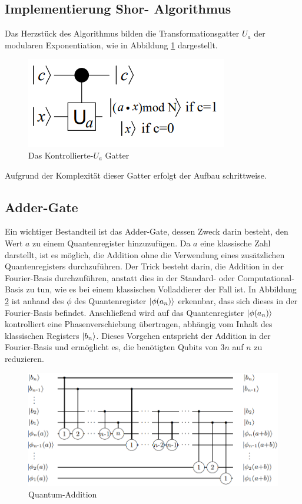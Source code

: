 \documentclass[
  a4paper, %
  10pt, %
  unnumberedsections, %
  twoside, %
]{LTJournalArticle}
\begin{document}
\subsection{\Large Implementierung Shor- Algorithmus}
Das Herzstück des Algorithmus bilden die Transformationsgatter $U_a$ der modularen Exponentiation,
wie in Abbildung \ref{fig:c-Ugate} dargestellt.
\begin{figure}[h]
\caption{Das Kontrollierte-$U_a$ Gatter\autocite{beauregard2003circuit}}
\label{fig:c-Ugate}
\includegraphics[scale=0.8]{c-Ugate.PNG}
\centering
\end{figure}
Aufgrund der Komplexität dieser Gatter erfolgt der Aufbau schrittweise.
\subsection{\large Adder-Gate}
Ein wichtiger Bestandteil ist das Adder-Gate, dessen Zweck darin besteht,
den Wert $a$ zu einem Quantenregister hinzuzufügen.
Da $a$ eine klassische Zahl darstellt, ist es möglich,
die Addition ohne die Verwendung eines zusätzlichen Quantenregisters durchzuführen.
Der Trick besteht darin, die Addition in der Fourier-Basis durchzuführen,
anstatt dies in der Standard- oder Computational-Basis zu tun,
wie es bei einem klassischen Volladdierer der Fall ist.
In Abbildung \ref{fig:Quantum-Addition} ist anhand des $\phi$ des Quantenregister $\ket{\phi(a_n)}$  erkennbar,
dass sich dieses in der Fourier-Basis befindet.
Anschließend wird auf das Quantenregister $\ket{\phi(a_n)}$ kontrolliert eine Phasenverschiebung übertragen,
abhängig vom Inhalt des klassischen Registers $\ket{b_n}$.
Dieses Vorgehen entspricht der Addition in der Fourier-Basis und ermöglicht es,
die benötigten Qubits von $3n$ auf $n$ zu reduzieren.
\begin{figure}[h]
\caption{Quantum-Addition\autocite{draper2000addition}}
\label{fig:Quantum-Addition}
\includegraphics[scale=0.4]{Quantum-Addition.PNG}
\centering
\end{figure}
\end{document}
